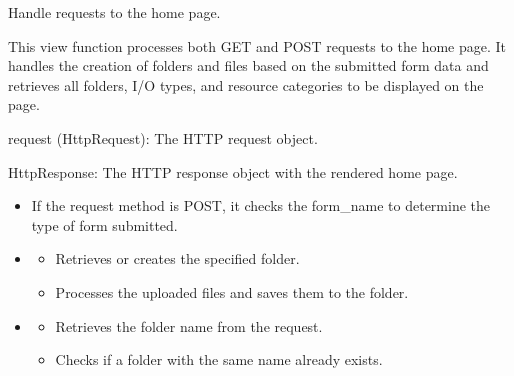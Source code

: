 \documentclass[letterpaper,10pt,english]{sphinxmanual}
\begin{document}

\begin{fulllineitems}
\label{\detokenize{app:app.views.home}}
\pysigstartsignatures
{}
\pysigstopsignatures
\sphinxAtStartPar
Handle requests to the home page.

\sphinxAtStartPar
This view function processes both GET and POST requests to the home page. It handles 
the creation of folders and files based on the submitted form data and retrieves all 
folders, I/O types, and resource categories to be displayed on the page.
\begin{description}
\sphinxAtStartPar
request (HttpRequest): The HTTP request object.

\sphinxAtStartPar
HttpResponse: The HTTP response object with the rendered home page.

\begin{itemize}
\item {} 
\sphinxAtStartPar
If the request method is POST, it checks the form\_name to determine the type of form submitted.

\item {} \begin{description}
\begin{itemize}
\item {} 
\sphinxAtStartPar
Retrieves or creates the specified folder.

\item {} 
\sphinxAtStartPar
Processes the uploaded files and saves them to the folder.

\end{itemize}

\end{description}

\item {} \begin{description}
\begin{itemize}
\item {} 
\sphinxAtStartPar
Retrieves the folder name from the request.

\item {} 
\sphinxAtStartPar
Checks if a folder with the same name already exists.


\end{itemize}
\end{description}
\end{itemize}
\end{description}
\end{fulllineitems}
\end{document}

